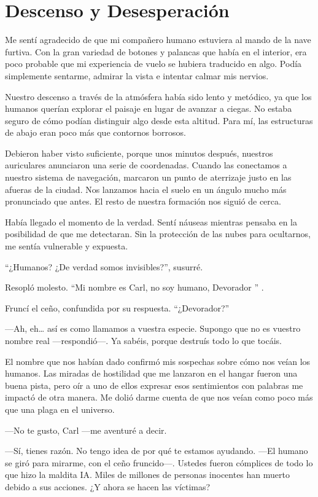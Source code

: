 \chapter{Descenso y Desesperación}\label{sec:descenso-y-desesperacion}

Me sentí agradecido de que mi compañero humano estuviera al mando de la nave furtiva. Con la gran variedad de botones y palancas que había en el interior, era poco probable que mi experiencia de vuelo se hubiera traducido en algo. Podía simplemente sentarme, admirar la vista e intentar calmar mis nervios.

Nuestro descenso a través de la atmósfera había sido lento y metódico, ya que los humanos querían explorar el paisaje en lugar de avanzar a ciegas. No estaba seguro de cómo podían distinguir algo desde esta altitud. Para mí, las estructuras de abajo eran poco más que contornos borrosos.

Debieron haber visto suficiente, porque unos minutos después, nuestros auriculares anunciaron una serie de coordenadas. Cuando las conectamos a nuestro sistema de navegación, marcaron un punto de aterrizaje justo en las afueras de la ciudad. Nos lanzamos hacia el suelo en un ángulo mucho más pronunciado que antes. El resto de nuestra formación nos siguió de cerca.

Había llegado el momento de la verdad. Sentí náuseas mientras pensaba en la posibilidad de que me detectaran. Sin la protección de las nubes para ocultarnos, me sentía vulnerable y expuesta.

“¿Humanos? ¿De verdad somos invisibles?”, susurré.

Resopló molesto. “Mi nombre es Carl, no soy humano, Devorador ” .

Fruncí el ceño, confundida por su respuesta. “¿Devorador?”

—Ah, eh… así es como llamamos a vuestra especie. Supongo que no es vuestro nombre real —respondió—. Ya sabéis, porque destruís todo lo que tocáis.

El nombre que nos habían dado confirmó mis sospechas sobre cómo nos veían los humanos. Las miradas de hostilidad que me lanzaron en el hangar fueron una buena pista, pero oír a uno de ellos expresar esos sentimientos con palabras me impactó de otra manera. Me dolió darme cuenta de que nos veían como poco más que una plaga en el universo.

—No te gusto, Carl —me aventuré a decir.

—Sí, tienes razón. No tengo idea de por qué te estamos ayudando. —El humano se giró para mirarme, con el ceño fruncido—. Ustedes fueron cómplices de todo lo que hizo la maldita IA. Miles de millones de personas inocentes han muerto debido a sus acciones. ¿Y ahora se hacen las víctimas?


